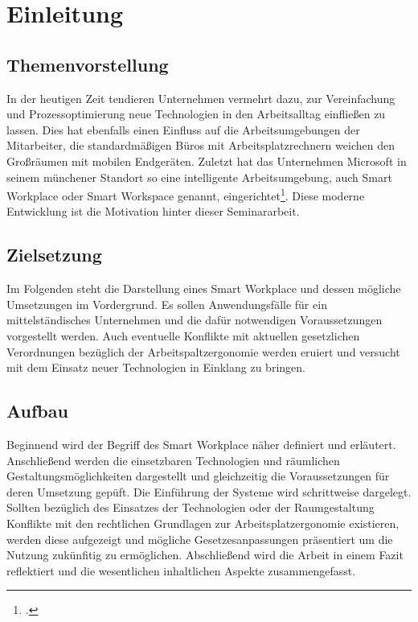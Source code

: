 \section{Einleitung}
\subsection{Themenvorstellung}
In der heutigen Zeit tendieren Unternehmen vermehrt dazu, zur Vereinfachung und Prozessoptimierung neue Technologien in den Arbeitsalltag einfließen zu lassen. Dies hat ebenfalls einen Einfluss auf die Arbeitsumgebungen der Mitarbeiter, die standardmäßigen Büros mit Arbeitsplatzrechnern weichen den Großräumen mit mobilen Endgeräten. Zuletzt hat das Unternehmen Microsoft in seinem münchener Standort so eine intelligente Arbeitsumgebung, auch Smart Workplace oder Smart Workspace genannt, eingerichtet\footcite[Vgl.][]{MicrosoftArtikel}. Diese moderne Entwicklung ist die Motivation hinter dieser Seminararbeit.

\subsection{Zielsetzung}
Im Folgenden steht die Darstellung eines Smart Workplace und dessen mögliche Umsetzungen im Vordergrund. Es sollen Anwendungsfälle für ein mittelständisches Unternehmen und die dafür notwendigen Voraussetzungen vorgestellt werden. Auch eventuelle Konflikte mit aktuellen gesetzlichen Verordnungen bezüglich der Arbeitspaltzergonomie werden eruiert und versucht mit dem Einsatz neuer Technologien in Einklang zu bringen.

\subsection{Aufbau}
Beginnend wird der Begriff des Smart Workplace näher definiert und erläutert. Anschließend werden die einsetzbaren Technologien und räumlichen Gestaltungsmöglichkeiten dargestellt und gleichzeitig die Voraussetzungen für deren Umsetzung gepüft. Die Einführung der Systeme wird schrittweise dargelegt. Sollten bezüglich des Einsatzes der Technologien oder der Raumgestaltung Konflikte mit den rechtlichen Grundlagen zur Arbeitsplatzergonomie existieren, werden diese aufgezeigt und mögliche Gesetzesanpassungen präsentiert um die Nutzung zukünfitig zu ermöglichen. Abschließend wird die Arbeit in einem Fazit reflektiert und die wesentlichen inhaltlichen Aspekte zusammengefasst.